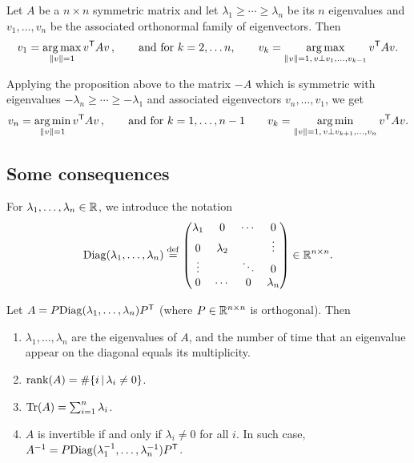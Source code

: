 \documentclass[11pt,nocut]{article}
\begin{document}
\begin{proposition}\label{prop:eigen_var}
	Let $A$ be a $n \times n$ symmetric matrix and let $\lambda_1 \geq \cdots \geq \lambda_n$ be its $n$ eigenvalues and $v_1, \dots, v_n$ be the associated orthonormal family of eigenvectors. Then 
	$$
	v_1 = \operatorname*{arg\,max}_{\|v\| = 1} v^{{\sf T}} A v\,,
	\qquad \text{and for} \ k=2, \dots n, \qquad
	v_{k} = \operatorname*{arg\,max}_{\|v\| = 1, \, v \perp v_1, \dots, v_{k-1}} v^{{\sf T}} A v.
	$$
\end{proposition}

\begin{remark} Applying the proposition above to the matrix $-A$ which is symmetric with eigenvalues $-\lambda_n \geq \cdots \geq -\lambda_1$ and associated eigenvectors $v_n, \dots, v_1$, we get
	$$
	v_n = \operatorname*{arg\,min}_{\|v\| = 1} v^{{\sf T}} A v\,,
	\qquad \text{and for} \ k=1, \dots , n-1 \qquad
	v_{k} = \operatorname*{arg\,min}_{\|v\| = 1, \, v \perp v_{k+1}, \dots, v_{n}} v^{{\sf T}} A v.
	$$
\end{remark}

\subsection{Some consequences}

For $\lambda_1, \dots, \lambda_n \in \mathbb{R}$, we introduce the notation
$$
{{\rm Diag}}(\lambda_1, \dots, \lambda_n) \overset{\rm def}{=}
\begin{pmatrix}
	\lambda_1 & 0 & \cdots & 0 \\
	0 & \lambda_2 & & \vdots \\
	\vdots & & \ddots & 0 \\
	0 & \cdots &  0 & \lambda_n
\end{pmatrix} \in \mathbb{R}^{n\times n}.
$$


\begin{proposition}
	Let $A = P {{\rm Diag}}(\lambda_1,\dots,\lambda_n) P^{{\sf T}}$ (where $P \in \mathbb{R}^{n \times n}$ is orthogonal). Then
	\begin{enumerate}
		\item $\lambda_1, \dots, \lambda_n$ are the eigenvalues of $A$, and the number of time that an eigenvalue appear on the diagonal equals its multiplicity.
		\item ${{\rm rank}}(A) = \# \{ i \, | \, \lambda_i \neq 0 \}$.
		\item ${{\rm Tr}}(A) = \sum_{i=1}^n \lambda_i$.
		\item $A$ is invertible if and only if $\lambda_i \neq 0$ for all $i$. In such case, $A^{-1} = P {{\rm Diag}}(\lambda_1^{-1}, \dots, \lambda_n^{-1}) P^{{\sf T}}$.
	\end{enumerate}
\end{proposition}
\end{document}

